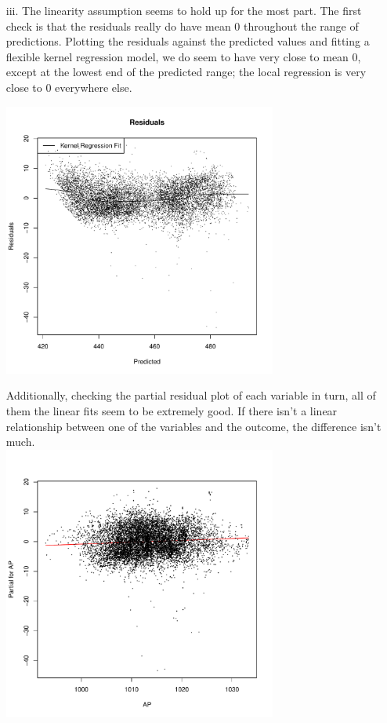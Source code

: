 \documentclass[11pt]{article}
\theoremstyle{definition}
\begin{document}
\begin{itemize}
\begin{itemize}
\begin{itemize}
\begin{center}
                        \end{center}
                    \item[iii.]
                        The linearity assumption seems to hold up for the most part. The first check is that the residuals really do have mean $0$ throughout the range of predictions. Plotting the residuals against the predicted values and fitting a flexible kernel regression model, we do seem to have very close to mean $0$, except at the lowest end of the predicted range; the local regression is very close to $0$ everywhere else.               
                        \begin{center}
                            \includegraphics[width=9cm]{final/2aiii_res_plot} 
                        \end{center}
                        Additionally, checking the partial residual plot of each variable in turn, all of them the linear fits seem to be extremely good. If there isn't a linear relationship between one of the variables and the outcome, the difference isn't much. \\
                        \includegraphics[width=9cm]{final/2aiii_pr_AP} 

\end{itemize}
\end{itemize}
\end{itemize}
\end{document}
